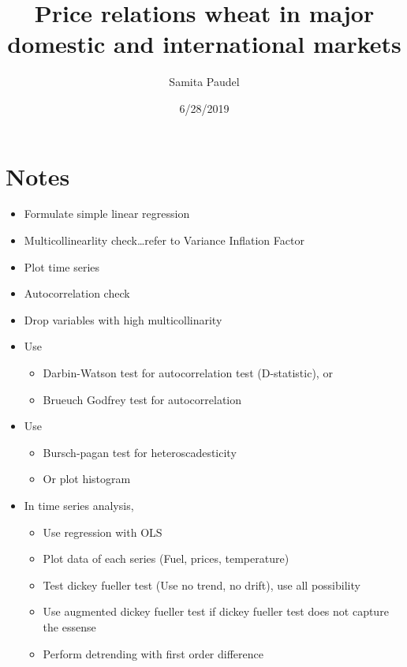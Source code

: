 \documentclass[
  12pt,
]{article}
\title{Price relations wheat in major domestic and international markets}
\author{Samita Paudel}
\date{6/28/2019}
\providecommand{\tightlist}{%
  \setlength{\itemsep}{0pt}\setlength{\parskip}{0pt}}
\begin{document}
\maketitle

\hypertarget{notes}{%
\section{Notes}\label{notes}}

\begin{itemize}
\tightlist
\item
  Formulate simple linear regression
\item
  Multicollinearlity check\ldots refer to Variance Inflation Factor
\item
  Plot time series
\item
  Autocorrelation check
\item
  Drop variables with high multicollinarity
\item
  Use

  \begin{itemize}
  \tightlist
  \item
    Darbin-Watson test for autocorrelation test (D-statistic), or
  \item
    Brueuch Godfrey test for autocorrelation
  \end{itemize}
\item
  Use

  \begin{itemize}
  \tightlist
  \item
    Bursch-pagan test for heteroscadesticity
  \item
    Or plot histogram
  \end{itemize}
\item
  In time series analysis,

  \begin{itemize}
  \tightlist
  \item
    Use regression with OLS
  \item
    Plot data of each series (Fuel, prices, temperature)
  \item
    Test dickey fueller test (Use no trend, no drift), use all possibility
  \item
    Use augmented dickey fueller test if dickey fueller test does not capture the essense
  \item
    Perform detrending with first order difference
  \end{itemize}
\end{itemize}
\end{document}
